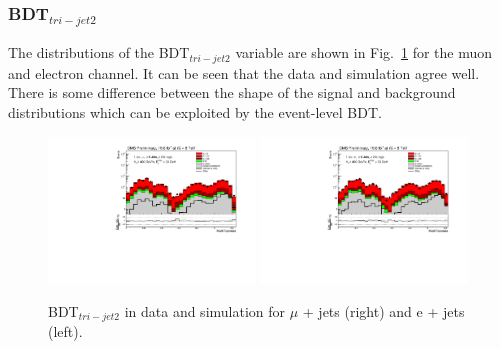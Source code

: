 \subsubsection*{BDT$_{tri-jet2}$}
The distributions of the BDT$_{tri-jet2}$ variable are shown in Fig.~\ref{fig:Multitopness} for the muon and electron channel. It can be seen that the data and simulation agree well. There is some difference between the shape of the signal and background distributions which can be exploited by the event-level BDT.

\begin{figure}[!ht]
    \includegraphics[width=0.49\textwidth]{images/Run1/MultiTopness_Mu.pdf}
    \includegraphics[width=0.49\textwidth]{images/Run1/MultiTopness_e.pdf}
    \caption{BDT$_{tri-jet2}$ in data and simulation for $\mu$ + jets (right) and e + jets (left).}
    \label{fig:Multitopness}
\end{figure}

